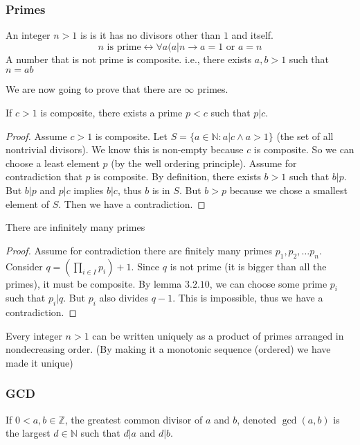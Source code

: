 \documentclass[11pt]{scrartcl}
\begin{document}
\subsubsection{Primes}
\begin{definition}
    An integer $n>1$ is  is it has no divisors other than $1$ and itself. \[ n \text{ is prime} \leftrightarrow \forall a( a|n \rightarrow a = 1 \text{ or } a =n\]
    A number that is not prime is composite.  i.e., there exists $a, b > 1$ such that $n=ab$
\end{definition}
We are now going to prove that there are $\infty$ primes.
\begin{lemma}
    If $c>1$ is composite, there exists a prime $p<c$ such that $p | c$.
\end{lemma}
\begin{proof}
    Assume $c > 1$ is composite. Let $S = \{a \in \mathbb{N} : a|c \wedge a > 1\}$ (the set of all nontrivial divisors). We know this is non-empty because $c$ is composite. So we can choose a least element $p$ (by the well ordering principle). Assume for contradiction that $p$ is composite. By definition, there exists $b>1$ such that $b|p$.  But $b|p$ and $p|c$ implies $b|c$, thus $b$ is in $S$.  But $b > p$ because we chose a smallest element of $S$.  Then we have a contradiction.
\end{proof}

\begin{theorem}
    There are infinitely many primes
\end{theorem}
\begin{proof}
    Assume for contradiction there are finitely many primes $p_1, p_2, \dots p_n$.  Consider $q = (\prod_{i \in I}p_i) + 1$.  Since $q$ is not prime (it is bigger than all the primes), it must be composite.  By lemma $3.2.10$, we can choose some prime $p_i$ such that $p_i|q$.  But $p_i$ also divides $q-1$.  This is impossible, thus we have a contradiction.
\end{proof}
\begin{theorem}
    Every integer $n>1$ can be written uniquely as a product of primes arranged in nondecreasing order. (By making it a monotonic sequence (ordered) we have made it unique)
\end{theorem}

\subsubsection{GCD}
\begin{definition}
    If $0< a, b \in \mathbb{Z}$, the greatest common divisor of $a$ and $b$, denoted $\gcd(a, b)$ is the largest $d \in \mathbb{N}$ such that $d|a$ and $d|b$.
\end{definition}
\end{document}
